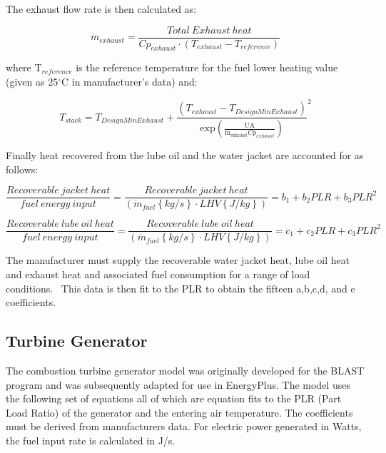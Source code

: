 The exhaust flow rate is then calculated as:

\begin{equation}
{\dot m_{exhaust}} = \frac{{Total~Exhaust~heat}}{{C{p_{exhaust}} \cdot \left( {{T_{exhaust}} - {T_{reference}}} \right)}}
\end{equation}

where T\(_{reference}\) is the reference temperature for the fuel lower heating value (given as 25\(^{\circ}\)C in manufacturer's data) and:

\begin{equation}
{T_{stack}} = {T_{DesignMinExhaust}} + {\frac{{\left( {{T_{exhaust}} - {T_{DesignMinExhaust}}} \right)}}{{{\mathrm{exp}}\left( {\frac{{{\mathrm{UA}}}}{{{{{\mathrm{\dot m}}}_{{\mathrm{exhaust}}}}C{p_{exhaust}}}}} \right)}}^2}
\end{equation}

Finally heat recovered from the lube oil and the water jacket are accounted for as follows:

\begin{equation}
\frac{{Recoverable~jacket~heat}}{{fuel~energy~input}} = \frac{{Recoverable~jacket~heat}}{{\left( {{{\dot m}_{fuel}}\left\{ {kg/s} \right\} \cdot LHV\left\{ {J/kg} \right\}} \right)}} = {b_1} + {b_2}PLR + {b_3}PL{R^2}
\end{equation}

\begin{equation}
\frac{{Recoverable~lube~oil~heat}}{{fuel~energy~input}} = \frac{{Recoverable~lube~oil~heat}}{{\left( {{{\dot m}_{fuel}}\left\{ {kg/s} \right\} \cdot LHV\left\{ {J/kg} \right\}} \right)}} = {c_1} + {c_2}PLR + {c_3}PL{R^2}
\end{equation}

The manufacturer must supply the recoverable water jacket heat, lube oil heat and exhaust heat and associated fuel consumption for a range of load conditions.~ This data is then fit to the PLR to obtain the fifteen a,b,c,d, and e coefficients.

\subsection{Turbine Generator}\label{turbine-generator}

The combustion turbine generator model was originally developed for the BLAST program and was subsequently adapted for use in EnergyPlus. The model uses the following set of equations all of which are equation fits to the PLR (Part Load Ratio) of the generator and the entering air temperature. The coefficients must be derived from manufacturers data. For electric power generated in Watts, the fuel input rate is calculated in J/s.

